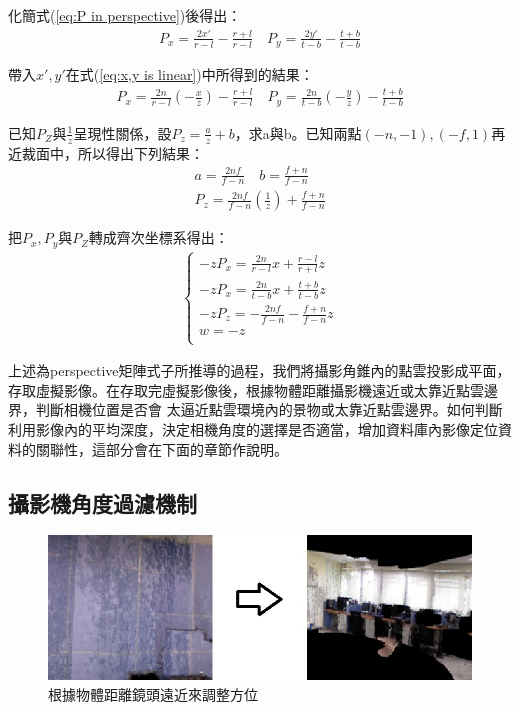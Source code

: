 	化簡式(\ref{eq:P in perspective})後得出：
	\begin{align}
		P_x = \frac{2x'}{r-l} - \frac{r+l}{r-l} \quad   P_y = \frac{2y'}{t-b} - \frac{t+b}{t-b}
	\end{align}
	
	帶入$x',y'$在式(\ref{eq:x,y is linear})中所得到的結果：
	\begin{align}
		P_x = \frac{2n}{r-l} (-\frac{x}{z}) - \frac{r+l}{r-l} 	\quad	P_y = \frac{2n}{t-b} (-\frac{y}{z}) - \frac{t+b}{t-b} 
	\end{align}
	
	已知$P_Z$與$\frac{1}{z} $呈現性關係，設$P_z = \frac{a}{z}+b$，求a與b。已知兩點$(-n,-1),(-f,1)$再近裁面中，所以得出下列結果：
	\begin{align}
		a = \frac{2nf}{f-n} \quad b = \frac{f+n}{f-n} \\
		P_z = \frac{2nf}{f-n}(\frac{1}{z}) + \frac{f+n}{f-n} 
	\end{align}
	
	把$P_x, P_y$與$P_Z$轉成齊次坐標系得出：
	\begin{align}
		\left\{
		\begin{array}{ccc}
		-zP_x = \frac{2n}{r-l}x + \frac{r-l}{r+l}z  \\
		-zP_x = \frac{2n}{t-b}x + \frac{t+b}{t-b}z  \\
		-zP_z = -\frac{2nf}{f-n} - \frac{f+n}{f-n}z \\
		w = -z\\
		\end{array}
		\right.
	\end{align}
	
	上述為perspective矩陣式子所推導的過程，我們將攝影角錐內的點雲投影成平面，存取虛擬影像。在存取完虛擬影像後，根據物體距離攝影機遠近或太靠近點雲邊界，判斷相機位置是否會
	太逼近點雲環境內的景物或太靠近點雲邊界。如何判斷利用影像內的平均深度，決定相機角度的選擇是否適當，增加資料庫內影像定位資料的關聯性，這部分會在下面的章節作說明。
	
\subsection{攝影機角度過濾機制}
%

	\begin{figure}
	\begin{center}
	  \includegraphics[width=1.0\textwidth]{figures/Depth_Filter.jpg}
	  \caption{根據物體距離鏡頭遠近來調整方位}
	  \label{fig:Depth_Filter}
	\end{center}
	\end{figure}

